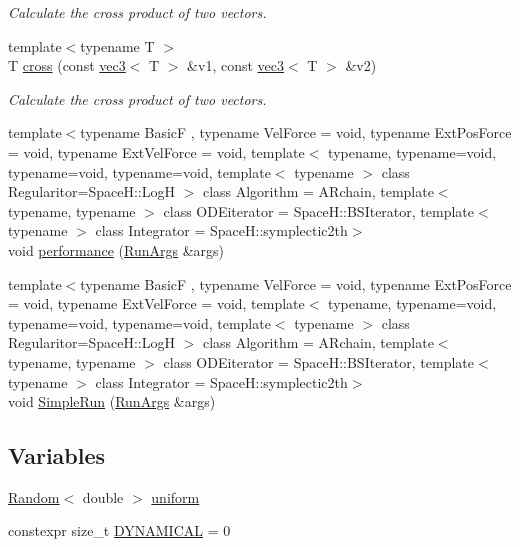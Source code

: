 \begin{DoxyCompactItemize}
\begin{DoxyCompactList}\small\item\em Calculate the cross product of two vectors. \end{DoxyCompactList}\item 
{\footnotesize template$<$typename T $>$ }\\T \mbox{\hyperlink{namespace_space_h_a6c74994ab4bf83a5f0d0bcfbaae6a82e}{cross}} (const \mbox{\hyperlink{struct_space_h_1_1vec3}{vec3}}$<$ T $>$ \&v1, const \mbox{\hyperlink{struct_space_h_1_1vec3}{vec3}}$<$ T $>$ \&v2)
\begin{DoxyCompactList}\small\item\em Calculate the cross product of two vectors. \end{DoxyCompactList}\item 
{\footnotesize template$<$typename BasicF , typename Vel\+Force  = void, typename Ext\+Pos\+Force  = void, typename Ext\+Vel\+Force  = void, template$<$ typename, typename=void, typename=void, typename=void, template$<$ typename $>$ class Regularitor=\+Space\+H\+::\+Log\+H $>$ class Algorithm = A\+Rchain, template$<$ typename, typename $>$ class O\+D\+Eiterator = Space\+H\+::\+B\+S\+Iterator, template$<$ typename $>$ class Integrator = Space\+H\+::symplectic2th$>$ }\\void \mbox{\hyperlink{namespace_space_h_a49b8d303aa5a0ac25f38b91ae20bb721}{performance}} (\mbox{\hyperlink{struct_space_h_1_1_run_args}{Run\+Args}} \&args)
\item 
{\footnotesize template$<$typename BasicF , typename Vel\+Force  = void, typename Ext\+Pos\+Force  = void, typename Ext\+Vel\+Force  = void, template$<$ typename, typename=void, typename=void, typename=void, template$<$ typename $>$ class Regularitor=\+Space\+H\+::\+Log\+H $>$ class Algorithm = A\+Rchain, template$<$ typename, typename $>$ class O\+D\+Eiterator = Space\+H\+::\+B\+S\+Iterator, template$<$ typename $>$ class Integrator = Space\+H\+::symplectic2th$>$ }\\void \mbox{\hyperlink{namespace_space_h_aadf57dac888f5b6e80de5ef3f27733dc}{Simple\+Run}} (\mbox{\hyperlink{struct_space_h_1_1_run_args}{Run\+Args}} \&args)
\end{DoxyCompactItemize}
\subsection*{Variables}
\begin{DoxyCompactItemize}
\item 
\mbox{\hyperlink{class_space_h_1_1_random}{Random}}$<$ double $>$ \mbox{\hyperlink{namespace_space_h_ade169b485ced9b07880a3fd40137b46f}{uniform}}
\item 
constexpr size\+\_\+t \mbox{\hyperlink{namespace_space_h_a3e55b9bc2a9e10c08ce8121bce11244a}{D\+Y\+N\+A\+M\+I\+C\+AL}} = 0
\end{DoxyCompactItemize}


